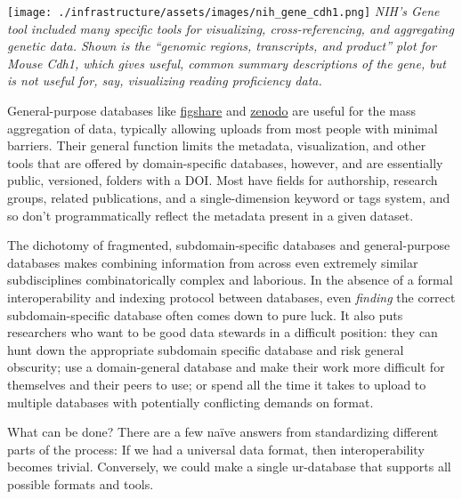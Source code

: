 \texttt{[image: ./infrastructure/assets/images/nih\_gene\_cdh1.png]}
\emph{NIH's Gene tool included many specific tools for visualizing,
cross-referencing, and aggregating genetic data. Shown is the ``genomic
regions, transcripts, and product'' plot for Mouse Cdh1, which gives
useful, common summary descriptions of the gene, but is not useful for,
say, visualizing reading proficiency data.}

General-purpose databases like \href{https://figshare.com/}{figshare}
and \href{https://zenodo.org/}{zenodo} are useful for the mass aggregation
of data, typically allowing uploads from most people with minimal
barriers. Their general function limits the metadata, visualization, and
other tools that are offered by domain-specific databases, however, and
are essentially public, versioned, folders with a DOI. Most have fields
for authorship, research groups, related publications, and a
single-dimension keyword or tags system, and so don't programmatically
reflect the metadata present in a given dataset.

The dichotomy of fragmented, subdomain-specific databases and
general-purpose databases makes combining information from across even
extremely similar subdisciplines combinatorically complex and laborious.
In the absence of a formal interoperability and indexing protocol
between databases, even \emph{finding} the correct subdomain-specific
database often comes down to pure luck. It also puts researchers who
want to be good data stewards in a difficult position: they can hunt
down the appropriate subdomain specific database and risk general
obscurity; use a domain-general database and make their work more
difficult for themselves and their peers to use; or spend all the time
it takes to upload to multiple databases with potentially conflicting
demands on format.

What can be done? There are a few naïve answers from standardizing
different parts of the process: If we had a universal data format, then
interoperability becomes trivial. Conversely, we could make a single
ur-database that supports all possible formats and tools.

